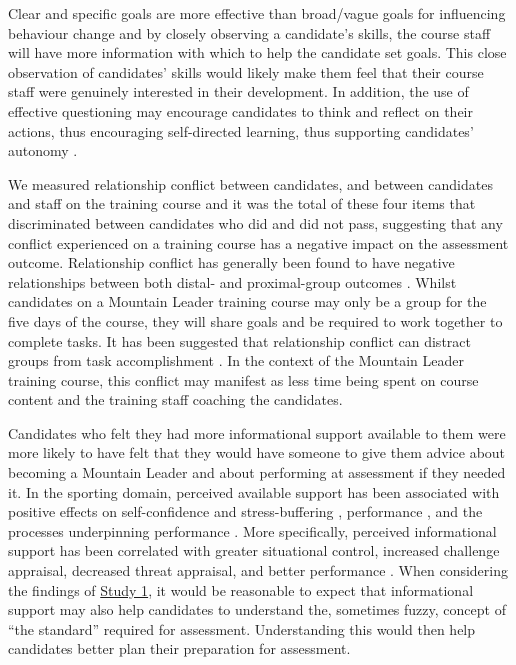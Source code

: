 \documentclass[
  12pt,
  a4paper,
]{book}
\begin{document}
Clear and specific goals are more effective than broad/vague goals for influencing behaviour change \citep{Gould2005} and by closely observing a candidate's skills, the course staff will have more information with which to help the candidate set goals. This close observation of candidates' skills would likely make them feel that their course staff were genuinely interested in their development. In addition, the use of effective questioning may encourage candidates to think and reflect on their actions, thus encouraging self-directed learning, thus supporting candidates' autonomy \citep{Wagstaff2018}.

We measured relationship conflict between candidates, and between candidates and staff on the training course and it was the total of these four items that discriminated between candidates who did and did not pass, suggesting that any conflict experienced on a training course has a negative impact on the assessment outcome. Relationship conflict has generally been found to have negative relationships between both distal- and proximal-group outcomes \citep[see][]{deWit2012}. Whilst candidates on a Mountain Leader training course may only be a group for the five days of the course, they will share goals and be required to work together to complete tasks. It has been suggested that relationship conflict can distract groups from task accomplishment \citep{Evan1965, Jehn1995}. In the context of the Mountain Leader training course, this conflict may manifest as less time being spent on course content and the training staff coaching the candidates.

Candidates who felt they had more informational support available to them were more likely to have felt that they would have someone to give them advice about becoming a Mountain Leader and about performing at assessment if they needed it. In the sporting domain, perceived available support has been associated with positive effects on self-confidence and stress-buffering \citep{Rees2007}, performance \citep{Freeman2009}, and the processes underpinning performance \citep{Rees1999}. More specifically, perceived informational support has been correlated with greater situational control, increased challenge appraisal, decreased threat appraisal, and better performance \citep{Freeman2009}. When considering the findings of \protect\hyperlink{ml-qualitative}{Study 1}, it would be reasonable to expect that informational support may also help candidates to understand the, sometimes fuzzy, concept of ``the standard'' required for assessment. Understanding this would then help candidates better plan their preparation for assessment.
\end{document}
